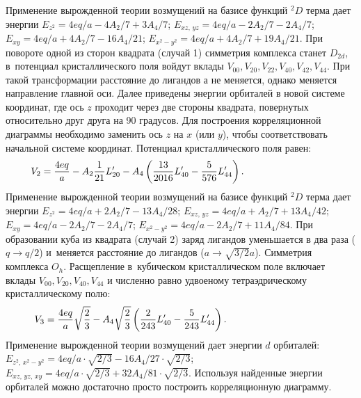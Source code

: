 Применение вырожденной теории возмущений на базисе функций $^2D$ терма дает энергии $E_{z^2} = 4eq/a - 4A_2/7 + {3A_4}/{7}$; $E_{xz,\, yz} = 4eq/a -{2A_2}/{7} - {2A_4}/{7}$; $E_{xy} = 4eq/a + {4A_2}/{7} - {16A_4}/{21}$; $E_{x^2-y^2} = 4eq/a + {4A_2}/{7} + {19A_4}/{21}$. При повороте одной из сторон квадрата (случай 1) симметрия комплекса станет $D_{2d}$, в~потенциал кристаллического поля  войдут вклады $V_{00}, V_{20}, V_{22}, V_{40}, V_{42}, V_{44}$. При такой трансформации расстояние до лигандов $а$ не меняется, однако меняется направление главной оси. Далее приведены энергии орбиталей в новой системе координат, где ось $z$ проходит через две стороны квадрата, повернутых относительно друг друга на 90 градусов. Для построения корреляционной диаграммы необходимо заменить ось $z$ на $x$ (или $y$), чтобы соответствовать начальной системе координат. Потенциал кристаллического поля равен:
\begin{equation*}
\begin{aligned}
& V_2= \dfrac{4eq}{a} - A_2 \dfrac{1}{21}L_{20}' - A_4 \left( \dfrac{13}{2016}L_{40}'  - \dfrac{5}{576}L_{44}' \right). \hspace{28mm}
\end{aligned}
\end{equation*}
Применение вырожденной теории возмущений на базисе функций $^2D$ терма дает энергии $E_{z^2} = 4eq/a + 2A_2/7 - {13A_4}/{28}$; $E_{xz,\, yz} = 4eq/a +{A_2}/{7} + {13A_4}/{42}$; $E_{xy} = 4eq/a - {2A_2}/{7} - {2A_4}/{7}$; $E_{x^2-y^2} = 4eq/a - {2A_2}/{7} + {11A_4}/{84}$. 
При образовании куба из квадрата (случай 2) заряд лигандов уменьшается в два раза ($q \rightarrow q/2$) и~меняется расстояние до лигандов ($a \rightarrow \sqrt{3/2}a$). Симметрия комплекса $O_h$. Расщепление в~кубическом кристаллическом поле включает вклады  $V_{00}, V_{20}, V_{40}, V_{44}$ и численно равно удвоеному тетраэдрическому кристаллическому полю:
\begin{equation*}
\begin{aligned}
& V_3= \dfrac{4eq}{a} \sqrt{\dfrac{2}{3}}  - A_4 \sqrt{\dfrac{2}{3}} \left( \dfrac{2}{243}L_{40}'  - \dfrac{5}{243}L_{44}' \right). \hspace{33mm}
\end{aligned}
\end{equation*}
Применение вырожденной теории возмущений дает энергии $d$ орбиталей: $E_{z^2,\,x^2-y^2} = 4eq/a \cdot \sqrt{2/3} -  16A_4/27 \cdot \sqrt{2/3} $; $E_{xz,\, yz,\,xy} =  4eq/a \cdot \sqrt{2/3} +  {32A_4}/{81} \cdot \sqrt{2/3}$. Используя найденные энергии орбиталей можно достаточно просто построить корреляционную диаграмму.\par

